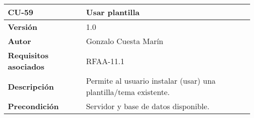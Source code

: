 \begin{longtable}[]{@{}ll@{}}
\toprule
\begin{minipage}[b]{0.23\columnwidth}\raggedright
\textbf{CU-59}\strut
\end{minipage} & \begin{minipage}[b]{0.71\columnwidth}\raggedright
\textbf{Usar plantilla}\strut
\end{minipage}\tabularnewline
\midrule
\endhead
\begin{minipage}[t]{0.23\columnwidth}\raggedright
\textbf{Versión}\strut
\end{minipage} & \begin{minipage}[t]{0.71\columnwidth}\raggedright
1.0\strut
\end{minipage}\tabularnewline
\begin{minipage}[t]{0.23\columnwidth}\raggedright
\textbf{Autor}\strut
\end{minipage} & \begin{minipage}[t]{0.71\columnwidth}\raggedright
Gonzalo Cuesta Marín\strut
\end{minipage}\tabularnewline
\begin{minipage}[t]{0.23\columnwidth}\raggedright
\textbf{Requisitos asociados}\strut
\end{minipage} & \begin{minipage}[t]{0.71\columnwidth}\raggedright
RFAA-11.1\strut
\end{minipage}\tabularnewline
\begin{minipage}[t]{0.23\columnwidth}\raggedright
\textbf{Descripción}\strut
\end{minipage} & \begin{minipage}[t]{0.71\columnwidth}\raggedright
Permite al usuario instalar (usar) una plantilla/tema existente.\strut
\end{minipage}\tabularnewline
\begin{minipage}[t]{0.23\columnwidth}\raggedright
\textbf{Precondición}\strut
\end{minipage} & \begin{minipage}[t]{0.71\columnwidth}\raggedright
Servidor y base de datos disponible.


\end{minipage}
\end{longtable}

